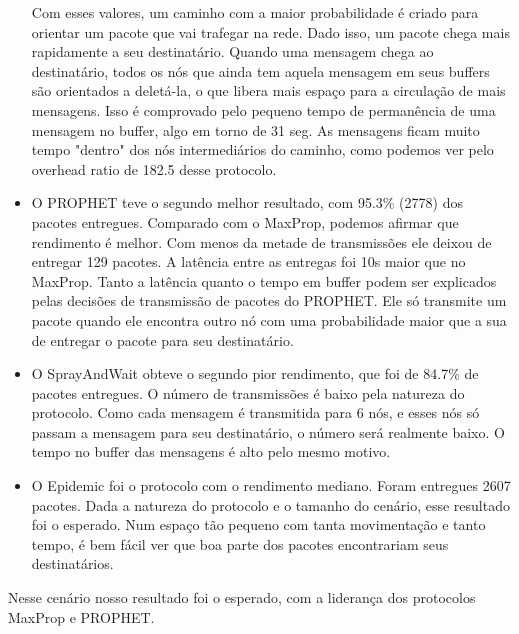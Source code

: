 \documentclass[conference]{IEEEtran}
\begin{document}
\begin{itemize}
			Com esses valores, um caminho com a maior probabilidade é criado para
			orientar um pacote que vai trafegar na rede. Dado isso, um pacote chega mais rapidamente a seu
			destinatário. Quando uma mensagem chega ao destinatário, todos os nós que ainda tem aquela mensagem
			em seus buffers são orientados a deletá-la, o que libera mais espaço para a circulação de mais 
			mensagens. Isso é comprovado pelo pequeno tempo de permanência de uma mensagem no buffer, algo
			em torno de 31 seg. As mensagens ficam muito tempo "dentro" dos nós intermediários do caminho,
			como podemos ver pelo overhead ratio de 182.5 desse protocolo.
		\item O PROPHET teve o segundo melhor resultado, com 95.3\% (2778) dos pacotes entregues. Comparado
			com o MaxProp, podemos afirmar que rendimento é melhor. Com menos da metade de transmissões
			ele deixou de entregar 129 pacotes. A latência entre as entregas foi 10s maior que no MaxProp.
			Tanto a latência quanto o tempo em buffer podem ser explicados pelas decisões de transmissão
			de pacotes do PROPHET. Ele só transmite um pacote quando ele encontra outro nó com uma
			probabilidade maior que a sua de entregar o pacote para seu destinatário.
		\item O SprayAndWait obteve o segundo pior rendimento, que foi de 84.7\% de pacotes entregues. O número de 
			transmissões é baixo pela natureza do protocolo. Como cada mensagem é transmitida para 6 nós, e
			esses nós só passam a mensagem para seu destinatário, o número será realmente baixo. O tempo
			no buffer das mensagens é alto pelo mesmo motivo. 
		\item O Epidemic foi o protocolo com o rendimento mediano. Foram entregues 2607 pacotes. Dada a natureza do
			protocolo e o tamanho do cenário, esse resultado foi o esperado. Num espaço tão pequeno com tanta
			movimentação e tanto tempo, é bem fácil ver que boa parte dos pacotes encontrariam seus
			destinatários.
  \end{itemize}
			
  Nesse cenário nosso resultado foi o esperado, com a liderança dos protocolos MaxProp e PROPHET.
			
\end{document}
